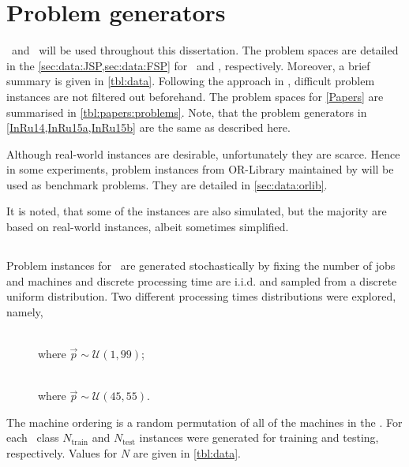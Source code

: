 
\chapter{Problem generators}\label{ch:genprobleminstances} 

 \JSP\ and \FSP\  will be used  throughout this dissertation. The  problem spaces are detailed in the \cref{sec:data:JSP,sec:data:FSP} for \JSP\ and \FSP, respectively. Moreover, a brief summary is given in \cref{tbl:data}.
Following the approach in \citet{Whitley}, difficult problem instances are not 
filtered out beforehand. %
The problem spaces for \cref{Papers} are summarised in 
\cref{tbl:papers:problems}. Note, that the problem generators in 
\cref{InRu14,InRu15a,InRu15b} are the same as described here.



Although real-world instances are desirable, unfortunately they are scarce. 
Hence in some experiments, problem instances from OR-Library maintained by 
\citet{ORlibrary} will be used as benchmark problems. They are detailed in 
\cref{sec:data:orlib}. 

It is noted, that some of the instances are also simulated, but the majority 
are based on real-world instances, albeit sometimes simplified. 

\section{\Jsp}\label{sec:data:JSP}
Problem instances for \JSP\ are generated stochastically by fixing the number of jobs and machines and 
discrete processing time are i.i.d. and sampled from a discrete uniform distribution. %
Two different processing times distributions were explored, namely,
\begin{description}
	\item[\Jrnd]  \hfill \\ where $\vec{p}\sim\mathcal{U}(1,99)$;
	\item[\Jrndn]  \hfill \\ where $\vec{p}\sim\mathcal{U}(45,55)$.
\end{description}
The machine ordering is a random permutation of all of the machines in the \jsp. 
For each \JSP\ class $N_{\text{train}}$  and $N_{\text{test}}$ instances were generated for training and testing, respectively. Values for $N$ are given in \cref{tbl:data}. 

